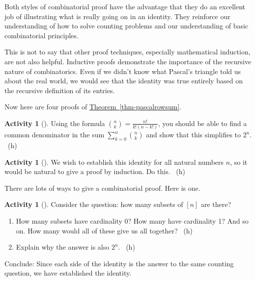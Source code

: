 \documentclass[10pt,]{book}
\theoremstyle{plain}
\theoremstyle{definition}
\theoremstyle{definition}
\theoremstyle{definition}
\newtheorem{activity}[project]{Activity}
\numberwithin{equation}{chapter}
\begin{document}
\par
\hypertarget{p-571}{}%
Both styles of combinatorial proof have the advantage that they do an excellent job of illustrating what is really going on in an identity.  They reinforce our understanding of how to solve counting problems and our understanding of basic combinatorial principles.%
\par
\hypertarget{p-572}{}%
This is not to say that other proof techniques, especially mathematical induction, are not also helpful.  Inductive proofs demonstrate the importance of the recursive nature of combinatorics.  Even if we didn't know what Pascal's triangle told us about the real world, we would see that the identity was true entirely based on the recursive definition of its entries.%
\par
\hypertarget{p-573}{}%
Now here are four proofs of \hyperref[thm-pascalrowsum]{Theorem~\ref{thm-pascalrowsum}}.%
\begin{activity}[]\label{act-pascalrowsum-alg}
\hypertarget{p-574}{}%
Using the formula \(\binom{n}{k} = \frac{n!}{k!(n-k!)}\), you should be able to find a common denominator in the sum \(\sum_{k=0}^n \binom{n}{k}\) and show that this simplifies to \(2^n\).%
~{\tiny (h)}\end{activity}
\begin{activity}[]\label{activity-70}
\hypertarget{p-576}{}%
We wish to establish this identity for all natural numbers \(n\), so it would be natural to give a proof by induction.  Do this.%
~{\tiny (h)}\end{activity}
\hypertarget{p-578}{}%
There are lots of ways to give a combinatorial proof.  Here is one.%
\begin{activity}[]\label{activity-pascalrow-dc}
\hypertarget{p-579}{}%
Consider the question: how many subsets of \([n]\) are there?%
\begin{enumerate}[font=\bfseries,label=(\alph*),ref=\alph*]
\item\label{task-109} \hypertarget{p-580}{}%
How many subsets have cardinality 0?  How many have cardinality 1?  And so on.  How many would all of these give us all together?%
~{\tiny (h)}\item\label{task-110} \hypertarget{p-582}{}%
Explain why the answer is also \(2^n\).%
~{\tiny (h)}\end{enumerate}
\bigbreak
\hypertarget{p-584}{}%
Conclude: Since each side of the identity is the answer to the same counting question, we have established the identity.%
\end{activity}
\hypertarget{p-585}{}%
\end{document}
